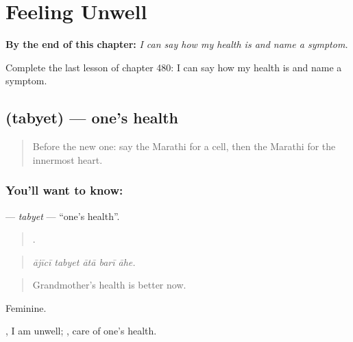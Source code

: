 
\chapter{Feeling Unwell}
\label{ch:mr-feeling-unwell}

\begin{chapteropening}
\textbf{By the end of this chapter:} \emph{I can say how my health is and name a symptom.}

Complete the last lesson of chapter 480: I can say how my health is and name a symptom.
\end{chapteropening}

\section[\texorpdfstring{\mr{तब्येत} (tabyet)}{तब्येत (tabyet)}]{ (tabyet) — one's health}

\label{lesson:MR-C480-tabyet}



\begin{quote}
Before the new one: say the Marathi for a cell, then the Marathi for the innermost heart.
\end{quote}

\subsection*{You'll want to know: }
\textbf{} — \emph{tabyet} — \textquotedblleft{}one's health\textquotedblright{}.

\begin{quote}
    .
\end{quote}

\begin{quote}
\emph{ājīcī tabyet ātā barī āhe.}
\end{quote}

\begin{quote}
Grandmother's health is better now.
\end{quote}

Feminine.

  , I am unwell;  , care of one's health.

